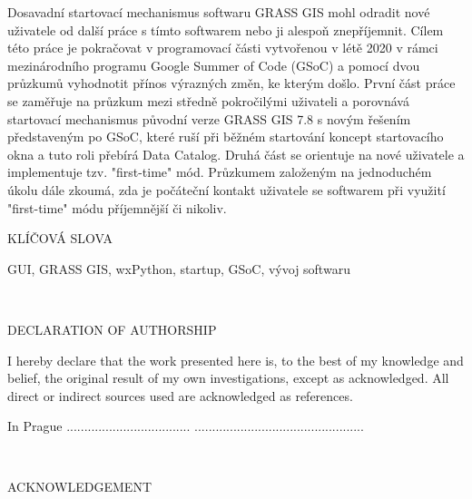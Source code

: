 \documentclass[a4paper,10pt,twoside]{article}
\begin{document}
\large
\noindent
Dosavadní startovací mechanismus softwaru GRASS GIS mohl odradit nové uživatele od další práce s tímto softwarem nebo ji alespoň znepříjemnit. Cílem této práce je pokračovat v programovací části vytvořenou v létě 2020 v rámci mezinárodního programu Google Summer of Code (GSoC) a pomocí dvou průzkumů vyhodnotit přínos výrazných změn, ke kterým došlo. První část práce se zaměřuje na průzkum mezi středně pokročilými uživateli a porovnává startovací mechanismus původní verze GRASS GIS 7.8 s novým řešením představeným po GSoC, které ruší při běžném startování koncept startovacího okna a tuto roli přebírá Data Catalog. Druhá část se orientuje na nové uživatele a implementuje tzv. "first-time" mód. Průzkumem založeným na jednoduchém úkolu dále zkoumá, zda je počáteční kontakt uživatele se softwarem při využití "first-time" módu příjemnější či nikoliv.

\vspace{2ex}
\begin{Large}
\noindent KLÍČOVÁ SLOVA
\end{Large}

\large
\noindent
\textrm{GUI, GRASS GIS, wxPython, startup, GSoC, vývoj softwaru}



\newpage ~ \newpage
\thispagestyle{empty}


\newpage
\mbox{}
\vfill
\begin{Large}
\noindent DECLARATION OF AUTHORSHIP
\end{Large}

I hereby declare that the work presented here is, to the best of my knowledge and belief, the original result of my own investigations, except as acknowledged.  All  direct  or  indirect  sources used are acknowledged as references.
\vspace{3ex}

\noindent In Prague ................................... \hfill ................................................


\newpage ~ \newpage
\thispagestyle{empty}



\newpage
\mbox{}
\vfill
\begin{Large}
\noindent ACKNOWLEDGEMENT
\end{Large}
\end{document}
